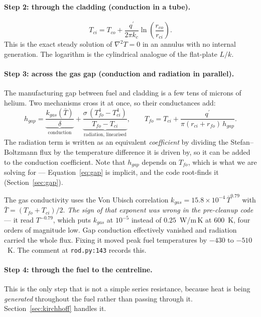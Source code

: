 \documentclass[11pt]{article}
\newcommand{\code}[1]{\texttt{#1}}
\newcommand{\qp}{q^{\prime}}
\begin{document}
\paragraph{Step 2: through the cladding (conduction in a tube).}
\begin{equation}
T_{ci} = T_{co} + \frac{\qp}{2\pi k_c}\ln\!\left(\frac{r_{co}}{r_{ci}}\right).
\end{equation}
This is the exact steady solution of $\nabla^2 T = 0$ in an annulus with no internal
generation. The logarithm is the cylindrical analogue of the flat-plate $L/k$.

\paragraph{Step 3: across the gas gap (conduction {\bf and} radiation in parallel).}
The manufacturing gap between fuel and cladding is a few tens of microns of helium. Two
mechanisms cross it at once, so their conductances add:
\begin{equation}
h_{gap} = \underbrace{\frac{k_{gas}(\bar T)}{\delta}}_{\text{conduction}}
        + \underbrace{\frac{\sigma\,(T_{fo}^4 - T_{ci}^4)}{T_{fo} - T_{ci}}}_{\text{radiation, linearised}},
\qquad
T_{fo} = T_{ci} + \frac{\qp}{\pi (r_{ci}+r_{fo})\,h_{gap}}.
\label{eq:gap}
\end{equation}
The radiation term is written as an equivalent \emph{coefficient} by dividing the
Stefan--Boltzmann flux by the temperature difference it is driven by, so it can be added
to the conduction coefficient. Note that $h_{gap}$ depends on $T_{fo}$, which is what we
are solving for --- Equation~\eqref{eq:gap} is implicit, and the code root-finds it
(Section~\ref{sec:gap}).

The gas conductivity uses the Von Ubisch correlation $k_{gas} = 15.8\times10^{-4}\,
\bar T^{0.79}$ with $\bar T = (T_{fo}+T_{ci})/2$. \emph{The sign of that exponent was
wrong in the pre-cleanup code} --- it read $T^{-0.79}$, which puts $k_{gas}$ at
$10^{-5}$ instead of $0.25$~W/m\,K at 600~K, four orders of magnitude low. Gap
conduction effectively vanished and radiation carried the whole flux. Fixing it moved
peak fuel temperatures by $-430$ to $-510$~K. The comment at \code{rod.py:143} records
this.

\paragraph{Step 4: through the fuel to the centreline.}
This is the only step that is not a simple series resistance, because heat is being
\emph{generated} throughout the fuel rather than passing through it.
Section~\ref{sec:kirchhoff} handles it.
\end{document}
